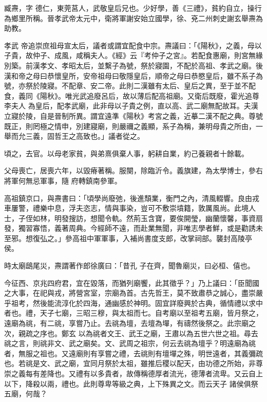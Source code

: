 
\begin{pinyinscope}

 臧燾，字
 德仁，東莞莒人，武敬皇后兄也。少好學，善《三禮》，貧約自立，操行為鄉里所稱。晉孝武帝太元中，衛將軍謝安始立國學，徐、兗二州刺史謝玄舉燾為助教。



 孝武
 帝追崇庶祖母宣太后，議者或謂宜配食中宗。燾議曰：「《陽秋》，之義，母以子貴，故仲子、成風，咸稱夫人。《經》云『考仲子之宮』。若配食惠廟，則宮無緣別築。前漢孝文、孝昭太后，並繫子為號，祭於寢園，不配於高祖、孝武之廟。後漢和帝之母曰恭懷皇所，安帝祖母曰敬隱皇后，順帝之母曰恭愍皇后，雖不系子為號，亦祭於陵寢。不配章、安二帝。此則二漢雖有太后、皇后之異，至于並不配食，義同《陽秋》。唯光武追廢呂后，故以薄后配高祖廟。又衛后既廢，霍光追尊李夫人
 為皇后，配孝武廟，此非母以子貴之例，直以高、武二廟無配故耳。夫漢立寢於陵，自是晉制所異。謂宜遠準《陽秋》考宮之義，近摹二漢不配之典。尊號既正，則罔極之情申，別建寢廟，則嚴禰之義顯，系子為稱，兼明母貴之所由，一舉而允三義，固哲王之高致也。」議者從之。



 頃之，去官。以母老家貧，與弟熹俱棄人事，躬耕自業，約己養親者十餘載。



 父母喪亡，居喪六年，以毀瘠著稱。服闋，除臨沂令。義旗建，為太學博士，參右將軍何無忌軍事，隨
 府轉鎮南參軍。



 高祖鎮京口，與燾書曰：「頃學尚廢弛，後進頹業，衡門之內，清風輟響。良由戎車屢警，禮樂中息，浮夫恣志，情與事染，豈可不敷崇墳籍，敦厲風尚。此境人士，子侄如林，明發搜訪，想聞令軌。然荊玉含寶，要俟開瑩，幽蘭懷馨，事資扇發，獨習寡悟，義著周典。今經師不遠，而赴業無聞，非唯志學者鮮，或是勸誘未至邪。想復弘之。」參高祖中軍軍事，入補尚書度支郎，改掌祠部。襲封高陵亭侯。



 時太廟鴟尾災，燾謂著作郎徐廣曰：「昔孔
 子在齊，聞魯廟災，曰必桓、僖也。



 今征西、京兆四府君，宜在毀落，而猶列廟饗，此其徵乎？」乃上議曰：「臣聞國之大事，在祀與戎，將營宮室，宗廟為首。古先哲王，莫不致肅恭之誠心，盡崇嚴乎祖考，然後能流淳化於四海，通幽感於神明。固宜詳廢興於古典，循情禮以求中者也。禮，天子七廟，三昭三穆，與太祖而七。自考廟以至祖考五廟，皆月祭之，遠廟為祧，有二祧，享嘗乃止。去祧為壇，去壇為墠，有禱然後祭之。此宗廟之次，親疏之序也。鄭玄
 以為祧者文王、武王之廟，王肅以為五世六世之祖。尋去祧之言，則祧非文、武之廟矣。文、武周之祖宗，何云去祧為壇乎？明遠廟為祧者，無服之祖也。又遠廟則有享嘗之禮，去祧則有壇墠之殊，明世遠者，其義彌疏也。若祧是文、武之廟，宜同月祭於太祖，雖推后稷以配天，由功德之所始，非尊崇之義每有差降也。又禮有以多貴者，故傳稱德厚者流光，德薄者流卑。又云自上以下，降殺以兩，禮也。此則尊卑等級之典，上下殊異之文。而云天子
 諸侯俱祭五廟，何哉？




\end{pinyinscope}
